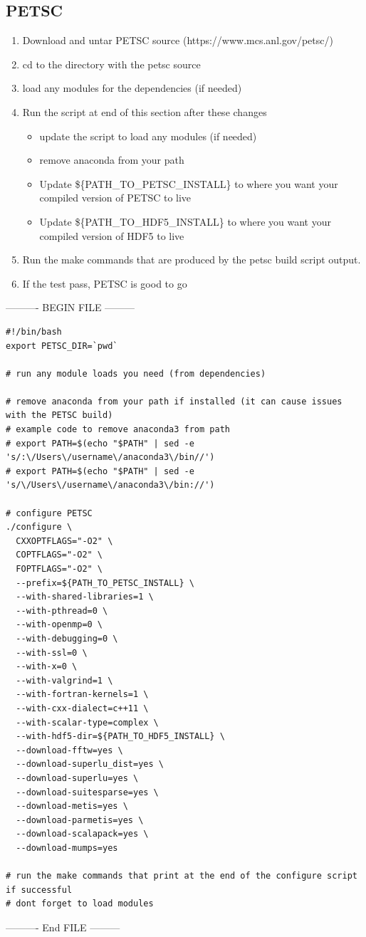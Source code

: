 \documentclass{article}
\begin{document}
\subsection{PETSC} %
\label{sub:petsc}
\begin{enumerate}
  \item Download and untar PETSC source (https://www.mcs.anl.gov/petsc/)
  \item cd to the directory with the petsc source
  \item load any modules for the dependencies (if needed)
  \item Run the script at end of this section after these changes
  \begin{itemize}
    \item update the script to load any modules (if needed)
    \item remove anaconda from your path
    \item Update \$\{PATH\_TO\_PETSC\_INSTALL\} to where you want your compiled version of PETSC to live
    \item Update \$\{PATH\_TO\_HDF5\_INSTALL\} to where you want your compiled version of HDF5 to live
  \end{itemize}
  \item Run the make commands that are produced by the petsc build script output.
  \item If the test pass, PETSC is good to go
\end{enumerate}


---------- BEGIN FILE ---------
\begin{verbatim}
#!/bin/bash
export PETSC_DIR=`pwd`

# run any module loads you need (from dependencies)

# remove anaconda from your path if installed (it can cause issues with the PETSC build)
# example code to remove anaconda3 from path
# export PATH=$(echo "$PATH" | sed -e 's/:\/Users\/username\/anaconda3\/bin//')
# export PATH=$(echo "$PATH" | sed -e 's/\/Users\/username\/anaconda3\/bin://')

# configure PETSC
./configure \
  CXXOPTFLAGS="-O2" \
  COPTFLAGS="-O2" \
  FOPTFLAGS="-O2" \
  --prefix=${PATH_TO_PETSC_INSTALL} \
  --with-shared-libraries=1 \
  --with-pthread=0 \
  --with-openmp=0 \
  --with-debugging=0 \
  --with-ssl=0 \
  --with-x=0 \
  --with-valgrind=1 \
  --with-fortran-kernels=1 \
  --with-cxx-dialect=c++11 \
  --with-scalar-type=complex \
  --with-hdf5-dir=${PATH_TO_HDF5_INSTALL} \
  --download-fftw=yes \
  --download-superlu_dist=yes \
  --download-superlu=yes \
  --download-suitesparse=yes \
  --download-metis=yes \
  --download-parmetis=yes \
  --download-scalapack=yes \
  --download-mumps=yes

# run the make commands that print at the end of the configure script if successful
# dont forget to load modules 
\end{verbatim}
---------- End FILE ---------
\end{document}
